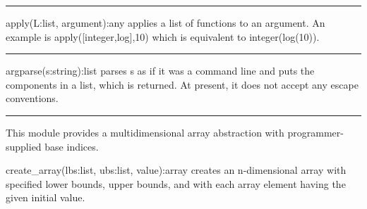 % 
% 

\vspace{0.25cm}\hrule{}

\textsf{apply(L:list, argument):any} applies a list of
functions to an argument. An example is
\textsf{apply([integer,log],10)} which is equivalent to
\textsf{integer(log(10))}. 

\vspace{0.25cm}\hrule{}

\textsf{argparse(s:string):list} parses \textsf{s} as if it was a
command line and puts the components in a list, which is returned. At
present, it does not accept any escape conventions. 

\vspace{0.25cm}\hrule{}

This module provides a multidimensional
array abstraction with programmer-supplied base indices.

\textsf{create\_array(lbs:list, ubs:list, value):array} creates an
n-dimensional array with specified lower bounds, upper bounds, and with
each array element having the given initial value.

